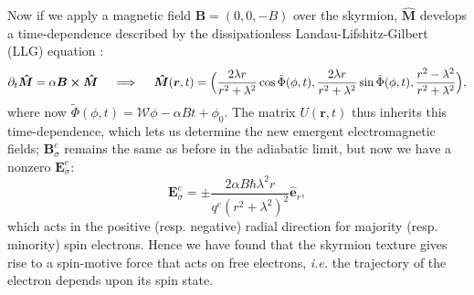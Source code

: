 \documentclass[a0paper,portrait]{baposter}
\begin{document}
\begin{poster}
{Now if we apply a magnetic field $\boldsymbol{B} = (0,0,-B)$ over the skyrmion, $\boldsymbol{\hat{M}}$ develops a time-dependence described by the dissipationless Landau-Lifshitz-Gilbert (LLG) equation \cite{Morinari:2010wg}:
$$\partial_{t}\boldsymbol{\hat{M}} = \alpha\boldsymbol{B}\cross\boldsymbol{\hat{M}} \quad \implies \quad \boldsymbol{\hat{M}}(\boldsymbol{r}, t) = \Big( \frac{2\lambda r}{r^{2} + \lambda^{2}}\cos\tilde{\Phi}(\phi,t), \frac{2\lambda r}{r^{2} + \lambda^{2}}\sin\tilde{\Phi}(\phi, t), \frac{r^{2} - \lambda^{2}}{r^{2} + \lambda^{2}}\Big),$$
where now $\tilde{\Phi}(\phi,t) = \mathcal{W}\phi - \alpha Bt + \phi_{0}$. The matrix $U(\boldsymbol{r},t)$ thus inherits this time-dependence, which lets us determine the new emergent electromagnetic fields; $\boldsymbol{B}^{e}_{\sigma}$ remains the same as before in the adiabatic limit, but now we have a nonzero $\boldsymbol{E}^{e}_{\sigma}$:$$\boldsymbol{E}^{e}_{\sigma} = \pm\frac{2\alpha B\hbar\lambda^{2}r}{q^{e}(r^{2} + \lambda^{2})^{2}}\boldsymbol{\hat{e}}_{r},$$
which acts in the positive (resp. negative) radial direction for majority (resp. minority) spin electrons. Hence we have found that the skyrmion texture gives rise to a spin-motive force that acts on free electrons, \textit{i.e.} the trajectory of the electron depends upon its spin state.


}


\end{poster}
\end{document}
